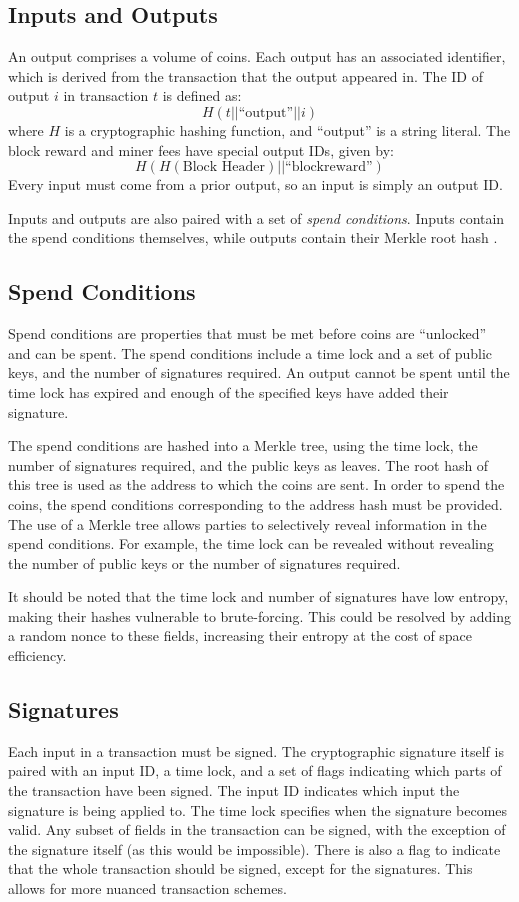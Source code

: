 \documentclass[twocolumn]{article}
\begin{document}
\subsection{Inputs and Outputs}
An output comprises a volume of coins.
Each output has an associated identifier, which is derived from the transaction that the output appeared in.
The ID of output $i$ in transaction $t$ is defined as:
\[
	H(t || \text{``output''} || i)
\]
where $H$ is a cryptographic hashing function, and ``output'' is a string literal.
The block reward and miner fees have special output IDs, given by:
\[
	H(H(\text{Block Header}) || \text{``blockreward''})
\]
Every input must come from a prior output, so an input is simply an output ID.

Inputs and outputs are also paired with a set of \textit{spend conditions}.
Inputs contain the spend conditions themselves, while outputs contain their Merkle root hash \cite{merkle}.

\subsection{Spend Conditions}
Spend conditions are properties that must be met before coins are ``unlocked'' and can be spent.
The spend conditions include a time lock and a set of public keys, and the number of signatures required.
An output cannot be spent until the time lock has expired and enough of the specified keys have added their signature.

The spend conditions are hashed into a Merkle tree, using the time lock, the number of signatures required, and the public keys as leaves.
The root hash of this tree is used as the address to which the coins are sent.
In order to spend the coins, the spend conditions corresponding to the address hash must be provided.
The use of a Merkle tree allows parties to selectively reveal information in the spend conditions.
For example, the time lock can be revealed without revealing the number of public keys or the number of signatures required.

It should be noted that the time lock and number of signatures have low entropy, making their hashes vulnerable to brute-forcing.
This could be resolved by adding a random nonce to these fields, increasing their entropy at the cost of space efficiency.

\subsection{Signatures}
Each input in a transaction must be signed.
The cryptographic signature itself is paired with an input ID, a time lock, and a set of flags indicating which parts of the transaction have been signed.
The input ID indicates which input the signature is being applied to.
The time lock specifies when the signature becomes valid.
Any subset of fields in the transaction can be signed, with the exception of the signature itself (as this would be impossible).
There is also a flag to indicate that the whole transaction should be signed, except for the signatures.
This allows for more nuanced transaction schemes.
\end{document}
